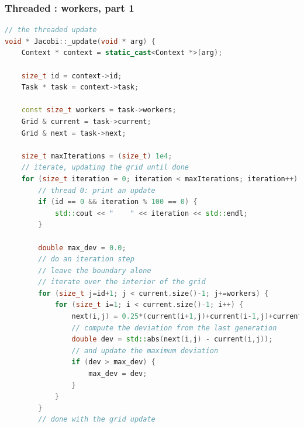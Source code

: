 \begin{frame}[fragile]
% 
  \frametitle{Threaded : workers, part 1}
%
  \begin{lstlisting}[language=c++,name=Jacobi:updated-solve,basicstyle=\tt\bfseries\tiny]
// the threaded update
void * Jacobi::_update(void * arg) {
    Context * context = static_cast<Context *>(arg);

    size_t id = context->id;
    Task * task = context->task;

    const size_t workers = task->workers;
    Grid & current = task->current;
    Grid & next = task->next;

    size_t maxIterations = (size_t) 1e4;
    // iterate, updating the grid until done
    for (size_t iteration = 0; iteration < maxIterations; iteration++) {
        // thread 0: print an update
        if (id == 0 && iteration % 100 == 0) {
            std::cout << "    " << iteration << std::endl;
        }

        double max_dev = 0.0;
        // do an iteration step
        // leave the boundary alone
        // iterate over the interior of the grid
        for (size_t j=id+1; j < current.size()-1; j+=workers) {
            for (size_t i=1; i < current.size()-1; i++) {
                next(i,j) = 0.25*(current(i+1,j)+current(i-1,j)+current(i,j+1)+current(i,j-1));
                // compute the deviation from the last generation
                double dev = std::abs(next(i,j) - current(i,j));
                // and update the maximum deviation
                if (dev > max_dev) {
                    max_dev = dev;
                }
            }
        }
        // done with the grid update
  \end{lstlisting}
%
\end{frame}

